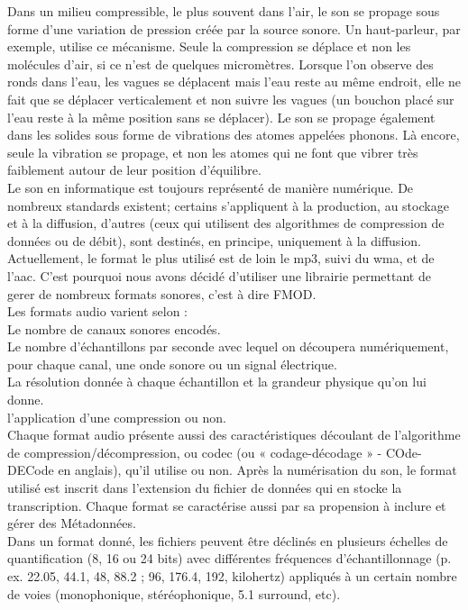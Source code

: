 \documentclass[12pt]{report}
\begin{document}
Dans un milieu compressible, le plus souvent dans l'air, le son se propage sous forme d'une variation de pression créée par la source sonore. Un haut-parleur, par exemple, utilise ce mécanisme. Seule la compression se déplace et non les molécules d'air, si ce n'est de quelques micromètres. Lorsque l'on observe des ronds dans l'eau, les vagues se déplacent mais l'eau reste au même endroit, elle ne fait que se déplacer verticalement et non suivre les vagues (un bouchon placé sur l'eau reste à la même position sans se déplacer). Le son se propage également dans les solides sous forme de vibrations des atomes appelées phonons. Là encore, seule la vibration se propage, et non les atomes qui ne font que vibrer très faiblement autour de leur position d'équilibre.\\

Le son en informatique est toujours représenté de manière numérique. De nombreux standards existent; certains s'appliquent à la production, au stockage et à la diffusion, d'autres (ceux qui utilisent des algorithmes de compression de données ou de débit), sont destinés, en principe, uniquement à la diffusion. Actuellement, le format le plus utilisé est de loin le mp3, suivi du wma, et de l'aac. C'est pourquoi nous avons décidé d'utiliser une librairie permettant de gerer de nombreux formats sonores, c'est à dire FMOD.\\


Les formats audio varient selon :\\

    Le nombre de canaux sonores encodés.\\
  Le nombre d'échantillons par seconde avec lequel on découpera numériquement, pour chaque canal, une onde sonore ou un signal électrique.\\
   La résolution donnée à chaque échantillon et la grandeur physique qu'on lui donne.\\
    l'application d'une compression ou non.\\

Chaque format audio présente aussi des caractéristiques découlant de l'algorithme de compression/décompression, ou codec (ou « codage-décodage » - COde-DECode en anglais), qu'il utilise ou non. Après la numérisation du son, le format utilisé est inscrit dans l'extension du fichier de données qui en stocke la transcription. Chaque format se caractérise aussi par sa propension à inclure et gérer des Métadonnées.\\

Dans un format donné, les fichiers peuvent être déclinés en plusieurs échelles de quantification (8, 16 ou 24 bits) avec différentes fréquences d'échantillonnage (p. ex. 22.05, 44.1, 48, 88.2 ; 96, 176.4, 192, kilohertz) appliqués à un certain nombre de voies (monophonique, stéréophonique, 5.1 surround, etc).\\
\end{document}
